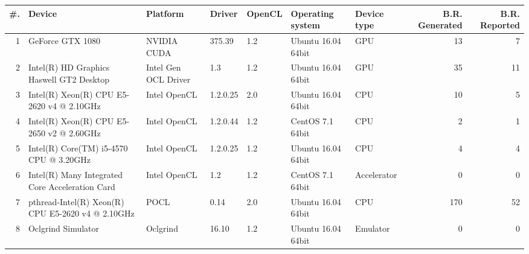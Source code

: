 \begin{tabular}{rllllllrr}
\toprule
 \#. &                                             Device &              Platform &    Driver & OpenCL &    Operating system &  Device type &  B.R. Generated &  B.R. Reported \\
\midrule
  1 &                                   GeForce GTX 1080 &           NVIDIA CUDA &    375.39 &    1.2 &  Ubuntu 16.04 64bit &          GPU &              13 &              7 \\
  2 &           Intel(R) HD Graphics Haswell GT2 Desktop &  Intel Gen OCL Driver &       1.3 &    1.2 &  Ubuntu 16.04 64bit &          GPU &              35 &             11 \\
  3 &          Intel(R) Xeon(R) CPU E5-2620 v4 @ 2.10GHz &          Intel OpenCL &  1.2.0.25 &    2.0 &  Ubuntu 16.04 64bit &          CPU &              10 &              5 \\
  4 &          Intel(R) Xeon(R) CPU E5-2650 v2 @ 2.60GHz &          Intel OpenCL &  1.2.0.44 &    1.2 &    CentOS 7.1 64bit &          CPU &               2 &              1 \\
  5 &            Intel(R) Core(TM) i5-4570 CPU @ 3.20GHz &          Intel OpenCL &  1.2.0.25 &    1.2 &  Ubuntu 16.04 64bit &          CPU &               4 &              4 \\
  6 &    Intel(R) Many Integrated Core Acceleration Card &          Intel OpenCL &       1.2 &    1.2 &    CentOS 7.1 64bit &  Accelerator &               0 &              0 \\
  7 &  pthread-Intel(R) Xeon(R) CPU E5-2620 v4 @ 2.10GHz &                  POCL &      0.14 &    2.0 &  Ubuntu 16.04 64bit &          CPU &             170 &             52 \\
  8 &                                 Oclgrind Simulator &              Oclgrind &     16.10 &    1.2 &  Ubuntu 16.04 64bit &     Emulator &               0 &              0 \\
\bottomrule
\end{tabular}
